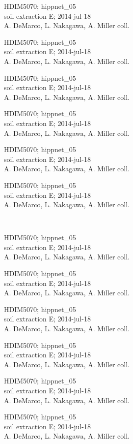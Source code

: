 \documentclass[2pt]{extarticle}
\begin{document}
\noindent
\parbox{0.16\textwidth}{\tiny \raggedright \rule[-0.3\baselineskip]{0pt}{10pt}HDIM5070; hippnet\_05\\ soil extraction E; 2014-jul-18\\ A. DeMarco, L. Nakagawa, A. Miller coll.}
\parbox{0.16\textwidth}{\tiny \raggedright \rule[-0.3\baselineskip]{0pt}{10pt}HDIM5070; hippnet\_05\\ soil extraction E; 2014-jul-18\\ A. DeMarco, L. Nakagawa, A. Miller coll.}
\parbox{0.16\textwidth}{\tiny \raggedright \rule[-0.3\baselineskip]{0pt}{10pt}HDIM5070; hippnet\_05\\ soil extraction E; 2014-jul-18\\ A. DeMarco, L. Nakagawa, A. Miller coll.}
\parbox{0.16\textwidth}{\tiny \raggedright \rule[-0.3\baselineskip]{0pt}{10pt}HDIM5070; hippnet\_05\\ soil extraction E; 2014-jul-18\\ A. DeMarco, L. Nakagawa, A. Miller coll.}
\parbox{0.16\textwidth}{\tiny \raggedright \rule[-0.3\baselineskip]{0pt}{10pt}HDIM5070; hippnet\_05\\ soil extraction E; 2014-jul-18\\ A. DeMarco, L. Nakagawa, A. Miller coll.}
\parbox{0.16\textwidth}{\tiny \raggedright \rule[-0.3\baselineskip]{0pt}{10pt}HDIM5070; hippnet\_05\\ soil extraction E; 2014-jul-18\\ A. DeMarco, L. Nakagawa, A. Miller coll.} \\ 
\vspace{0.001in} 

\noindent
\parbox{0.16\textwidth}{\tiny \raggedright \rule[-0.3\baselineskip]{0pt}{10pt}HDIM5070; hippnet\_05\\ soil extraction E; 2014-jul-18\\ A. DeMarco, L. Nakagawa, A. Miller coll.}
\parbox{0.16\textwidth}{\tiny \raggedright \rule[-0.3\baselineskip]{0pt}{10pt}HDIM5070; hippnet\_05\\ soil extraction E; 2014-jul-18\\ A. DeMarco, L. Nakagawa, A. Miller coll.}
\parbox{0.16\textwidth}{\tiny \raggedright \rule[-0.3\baselineskip]{0pt}{10pt}HDIM5070; hippnet\_05\\ soil extraction E; 2014-jul-18\\ A. DeMarco, L. Nakagawa, A. Miller coll.}
\parbox{0.16\textwidth}{\tiny \raggedright \rule[-0.3\baselineskip]{0pt}{10pt}HDIM5070; hippnet\_05\\ soil extraction E; 2014-jul-18\\ A. DeMarco, L. Nakagawa, A. Miller coll.}
\parbox{0.16\textwidth}{\tiny \raggedright \rule[-0.3\baselineskip]{0pt}{10pt}HDIM5070; hippnet\_05\\ soil extraction E; 2014-jul-18\\ A. DeMarco, L. Nakagawa, A. Miller coll.}
\parbox{0.16\textwidth}{\tiny \raggedright \rule[-0.3\baselineskip]{0pt}{10pt}HDIM5070; hippnet\_05\\ soil extraction E; 2014-jul-18\\ A. DeMarco, L. Nakagawa, A. Miller coll.} \\ 
\vspace{0.001in} 
\end{document}
